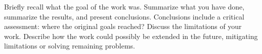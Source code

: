 Briefly recall what the goal of the work was. Summarize what you have done, summarize the results, and present conclusions. Conclusions include a critical assessment: where the original goals reached? Discuss the limitations of your work. Describe how the work could possibly be extended in the future, mitigating limitations or solving remaining problems.